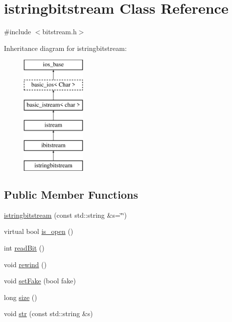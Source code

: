 \hypertarget{classistringbitstream}{}\section{istringbitstream Class Reference}
\label{classistringbitstream}


{\ttfamily \#include $<$bitstream.\+h$>$}

Inheritance diagram for istringbitstream\+:\begin{figure}[H]
\begin{center}
\leavevmode
\includegraphics[height=6.000000cm]{classistringbitstream}
\end{center}
\end{figure}
\subsection*{Public Member Functions}
\begin{DoxyCompactItemize}
\item 
\mbox{\hyperlink{classistringbitstream_ae086e9a41bc91c4c64af792ff0aff81d}{istringbitstream}} (const std\+::string \&s=\char`\"{}\char`\"{})
\item 
virtual bool \mbox{\hyperlink{classibitstream_a2f57f54d8c03b615bb31eee091d8a88a}{is\+\_\+open}} ()
\item 
int \mbox{\hyperlink{classibitstream_aa8c615fa7957fb0232a0873dadbd39e8}{read\+Bit}} ()
\item 
void \mbox{\hyperlink{classibitstream_ab8734e666421c9fe3b6380a818c6c727}{rewind}} ()
\item 
void \mbox{\hyperlink{classibitstream_ad916b4624eb09d375514964f867b475c}{set\+Fake}} (bool fake)
\item 
long \mbox{\hyperlink{classibitstream_a22727e9c338fb1aaa6722031445373c3}{size}} ()
\item 
void \mbox{\hyperlink{classistringbitstream_a4a07e41ddf13ced3f7e3997886b48805}{str}} (const std\+::string \&s)
\end{DoxyCompactItemize}


